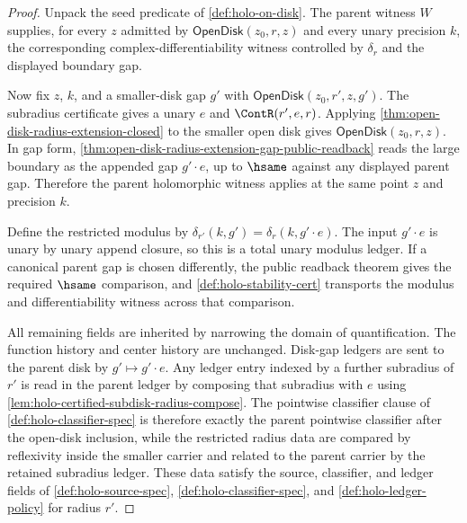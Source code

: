 \begin{proof}
Unpack the seed predicate of \autoref{def:holo-on-disk}. The parent witness $W$ supplies, for every $z$ admitted by $\mathsf{OpenDisk}(z_0,r,z)$ and every unary precision $k$, the corresponding complex-differentiability witness controlled by $\delta_r$ and the displayed boundary gap.

Now fix $z$, $k$, and a smaller-disk gap $g'$ with $\mathsf{OpenDisk}(z_0,r',z,g')$. The subradius certificate gives a unary $e$ and $\ContR(r',e,r)$. Applying \autoref{thm:open-disk-radius-extension-closed} to the smaller open disk gives $\mathsf{OpenDisk}(z_0,r,z)$. In gap form, \autoref{thm:open-disk-radius-extension-gap-public-readback} reads the large boundary as the appended gap $g'\cdot e$, up to $\hsame$ against any displayed parent gap. Therefore the parent holomorphic witness applies at the same point $z$ and precision $k$.

Define the restricted modulus by $\delta_{r'}(k,g')=\delta_r(k,g'\cdot e)$. The input $g'\cdot e$ is unary by unary append closure, so this is a total unary modulus ledger. If a canonical parent gap is chosen differently, the public readback theorem gives the required $\hsame$ comparison, and \autoref{def:holo-stability-cert} transports the modulus and differentiability witness across that comparison.

All remaining fields are inherited by narrowing the domain of quantification. The function history and center history are unchanged. Disk-gap ledgers are sent to the parent disk by $g'\mapsto g'\cdot e$. Any ledger entry indexed by a further subradius of $r'$ is read in the parent ledger by composing that subradius with $e$ using \autoref{lem:holo-certified-subdisk-radius-compose}. The pointwise classifier clause of \autoref{def:holo-classifier-spec} is therefore exactly the parent pointwise classifier after the open-disk inclusion, while the restricted radius data are compared by reflexivity inside the smaller carrier and related to the parent carrier by the retained subradius ledger. These data satisfy the source, classifier, and ledger fields of \autoref{def:holo-source-spec}, \autoref{def:holo-classifier-spec}, and \autoref{def:holo-ledger-policy} for radius $r'$.
\end{proof}

